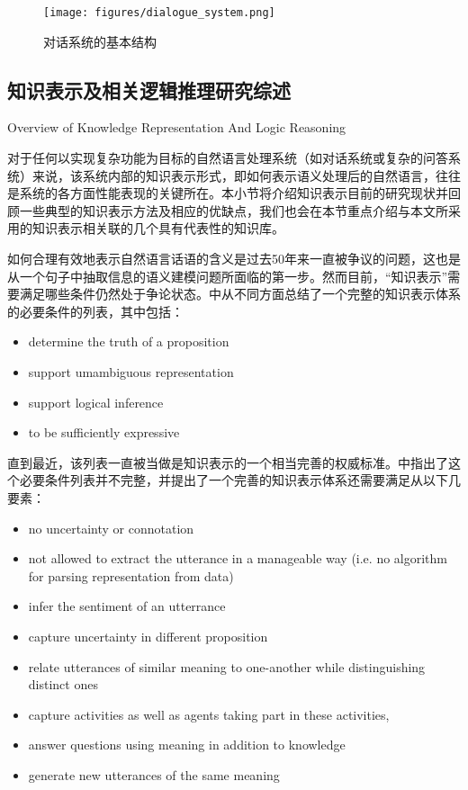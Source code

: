 \begin{figure}[htb]
\centering
\texttt{[image: figures/dialogue\_system.png]}
\caption{对话系统的基本结构}
\label{fig:dialogue}
\end{figure}


\subsection{知识表示及相关逻辑推理研究综述}{Overview of Knowledge Representation And Logic Reasoning}
\label{sec:representationReview}

对于任何以实现复杂功能为目标的自然语言处理系统（如对话系统或复杂的问答系统）来说，该系统内部的知识表示形式，即如何表示语义处理后的自然语言，往往是系统的各方面性能表现的关键所在。本小节将介绍知识表示目前的研究现状并回顾一些典型的知识表示方法及相应的优缺点，我们也会在本节重点介绍与本文所采用的知识表示相关联的几个具有代表性的知识库。

如何合理有效地表示自然语言话语的含义是过去50年来一直被争议的问题，这也是从一个句子中抽取信息的语义建模问题所面临的第一步。然而目前，“知识表示”需要满足哪些条件仍然处于争论状态。\cite{Jurafsky2009}中从不同方面总结了一个完整的知识表示体系的必要条件的列表，其中包括：

\begin{itemize}
\item determine the truth of a proposition
\item support umambiguous representation
\item support logical inference
\item to be sufficiently expressive
\end{itemize}

直到最近，该列表一直被当做是知识表示的一个相当完善的权威标准。\cite{Yarin2013}中指出了这个必要条件列表并不完整，并提出了一个完善的知识表示体系还需要满足从以下几要素：

\begin{itemize}
\item no uncertainty or connotation
\item not allowed to extract the utterance in a manageable way (i.e. no algorithm for parsing representation from data)
\item infer the sentiment of an utterrance
\item capture uncertainty in different proposition
\item relate utterances of similar meaning to one-another while distinguishing distinct ones
\item capture activities as well as agents taking part in these activities,
\item answer questions using meaning in addition to knowledge
\item generate new utterances of the same meaning
\end{itemize}



